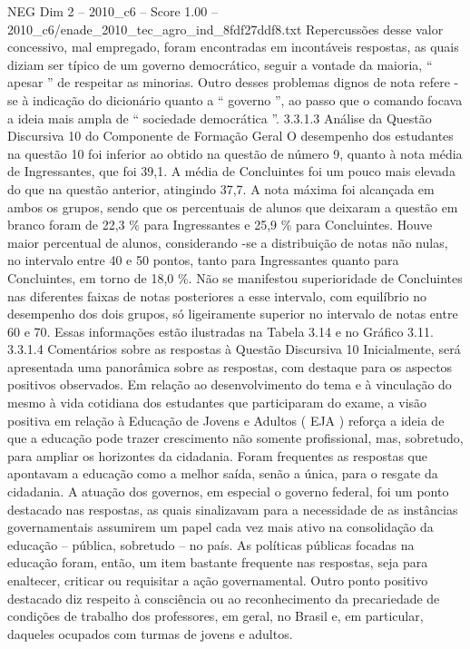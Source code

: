 \begin{textsample}{NEG Dim 2 – 2010\_c6 – Score 1.00 – 2010\_c6/enade\_2010\_tec\_agro\_ind\_8fdf27ddf8.txt}
Repercussões desse valor concessivo, mal empregado, foram encontradas em incontáveis respostas, as quais diziam ser típico de um governo democrático, seguir a vontade da maioria, “ apesar ” de respeitar as minorias.
Outro desses problemas dignos de nota refere -se à indicação do dicionário quanto a “ governo ”, ao passo que o comando focava a ideia mais ampla de “ sociedade democrática ”. 3.3.1.3 Análise da Questão Discursiva 10 do Componente de Formação Geral O desempenho dos estudantes na questão 10 foi inferior ao obtido na questão de número 9, quanto à nota média de Ingressantes, que foi 39,1.
A média de Concluintes foi um pouco mais elevada do que na questão anterior, atingindo 37,7.
A nota máxima foi alcançada em ambos os grupos, sendo que os percentuais de alunos que deixaram a questão em branco foram de 22,3 \% para Ingressantes e 25,9 \% para Concluintes.
Houve maior percentual de alunos, considerando -se a distribuição de notas não nulas, no intervalo entre 40 e 50 pontos, tanto para Ingressantes quanto para Concluintes, em torno de 18,0 \%.
Não se manifestou superioridade de Concluintes nas diferentes faixas de notas posteriores a esse intervalo, com equilíbrio no desempenho dos dois grupos, só ligeiramente superior no intervalo de notas entre 60 e 70.
Essas informações estão ilustradas na Tabela 3.14 e no Gráfico 3.11. 3.3.1.4 Comentários sobre as respostas à Questão Discursiva 10 Inicialmente, será apresentada uma panorâmica sobre as respostas, com destaque para os aspectos positivos observados.
Em relação ao desenvolvimento do tema e à vinculação do mesmo à vida cotidiana dos estudantes que participaram do exame, a visão positiva em relação à Educação de Jovens e Adultos ( EJA ) reforça a ideia de que a educação pode trazer crescimento não somente profissional, mas, sobretudo, para ampliar os horizontes da cidadania.
Foram frequentes as respostas que apontavam a educação como a melhor saída, senão a única, para o resgate da cidadania.
A atuação dos governos, em especial o governo federal, foi um ponto destacado nas respostas, as quais sinalizavam para a necessidade de as instâncias governamentais assumirem um papel cada vez mais ativo na consolidação da educação – pública, sobretudo – no país.
As políticas públicas focadas na educação foram, então, um item bastante frequente nas respostas, seja para enaltecer, criticar ou requisitar a ação governamental.
Outro ponto positivo destacado diz respeito à consciência ou ao reconhecimento da precariedade de condições de trabalho dos professores, em geral, no Brasil e, em particular, daqueles ocupados com turmas de jovens e adultos.

\end{textsample}
